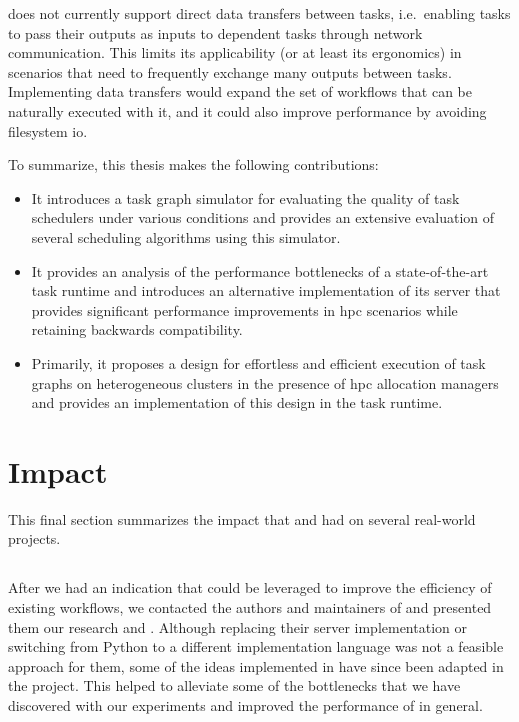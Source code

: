 \begin{description}[wide=0pt]
		\hyperqueue{} does not currently support direct data transfers
		between tasks, i.e.\ enabling tasks to pass their outputs as inputs to dependent tasks through
		network communication. This limits its applicability (or at least its ergonomics) in scenarios that
		need to frequently exchange many outputs between tasks. Implementing data transfers would expand
		the set of workflows that can be naturally executed with it, and it could also improve performance
		by avoiding filesystem \gls{io}.
\end{description}

To summarize, this thesis makes the following contributions:
\begin{itemize}
	\item It introduces a task graph simulator for evaluating the quality of task schedulers under various
	      conditions and provides an extensive evaluation of several scheduling algorithms using this
	      simulator.
	\item It provides an analysis of the performance bottlenecks of a state-of-the-art task runtime
	      \dask{} and introduces an alternative implementation of its server that provides
	      significant performance improvements in \gls{hpc} scenarios while retaining
	      backwards compatibility.
	\item Primarily, it proposes a design for effortless and efficient execution of task graphs on
	      heterogeneous clusters in the presence of \gls{hpc} allocation managers and
	      provides an implementation of this design in the \hyperqueue{} task runtime.
\end{itemize}

\section{Impact}
This final section summarizes the impact that \rsds{} and
\hyperqueue{} had on several real-world projects.

\subsection*{\rsds{}}
After we had an indication that \rsds{} could be leveraged to improve the
efficiency of existing \dask{} workflows, we contacted the authors and
maintainers of \dask{} and presented them our research and
\rsds{}. Although replacing their server implementation or switching from Python
to a different implementation language was not a feasible approach for them, some of the ideas
implemented in \rsds{} have since been adapted in the \dask{}
project. This helped to alleviate some of the bottlenecks that we have discovered with our
experiments and improved the performance of \dask{} in
general.

